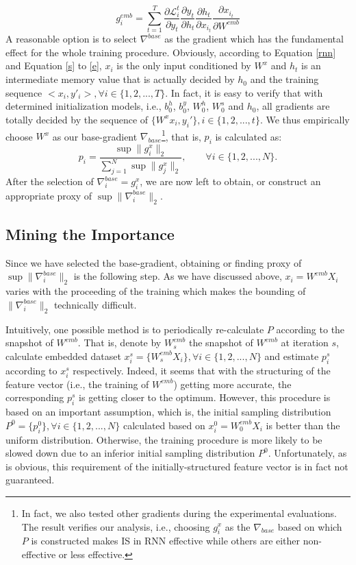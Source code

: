 \documentclass[twoside,leqno,twocolumn]{article}
\begin{document}
\begin{equation}
g_i^{emb}=\sum_{t=1}^{T}\frac{\partial \mathcal{L}_i^t}{\partial y_{t}}\frac{\partial y_t}{\partial h_{t}}\frac{\partial h_t}{\partial x_{i_t}}\frac{\partial x_{i_t}}{\partial W^{emb}}
\label{e}
\end{equation}
A reasonable option is to select $\nabla^{base}$ as the gradient which has the fundamental effect for the whole training procedure. Obviously, according to Equation \ref{rnn} and Equation \ref{s} to \ref{e}, $x_i$ is the only input conditioned by $W^x$ and $h_t$ is an intermediate memory value that is actually decided by $h_0$ and the training sequence $<x_i,y'_i>, \forall i \in \{1,2,...,T\}$. In fact, it is easy to verify that with determined initialization models, i.e., $b^h_0$, $b^y_0$, $W^h_0$, $W^s_0$ and $h_0$, all gradients are totally decided by the sequence of $\{W^xx_i,y_i'\}, i \in\{1,2,...,t\}$. We thus empirically choose $W^x$ as our base-gradient $\nabla_{base}$\footnote{In fact, we also tested other gradients during the experimental evaluations. The result verifies our analysis, i.e., choosing $g_i^x$ as the $\nabla_{base}$ based on which $P$ is constructed makes IS in RNN effective while others are either non-effective or less effective.}, that is, $p_i$ is calculated as:
\begin{equation}
	p_i=\frac{\sup\|g_i^x\|_2}{\sum_{j=1}^{N}\sup\|g_j^x\|_2}, \qquad \forall i \in \{1,2,...,N\}.
\end{equation}
After the selection of $\nabla^{base}_i=g_i^x$, we are now left to obtain, or construct an appropriate proxy of $\sup\|\nabla^{base}_i\|_2$.
\subsection{Mining the Importance}
Since we have selected the base-gradient, obtaining or finding proxy of $\sup \|\nabla^{base}_i\|_2$ is the following step. As we have discussed above, $x_i=W^{emb}X_{i}$ varies with the proceeding of the training which makes the bounding of $\|\nabla^{base}_i\|_2$ technically difficult.

Intuitively, one possible method is to periodically re-calculate $P$ according to the snapshot of $W^{emb}$. That is, denote by $W^{emb}_s$ the snapshot of $W^{emb}$ at iteration $s$, calculate embedded dataset $x_i^s=\{W^{emb}_{s}X_i\}, \forall i\in\{1,2,...,N\}$ and estimate $p_i^{s}$ according to $x_i^s$ respectively. Indeed, it seems that with the structuring of the feature vector (i.e., the training of $W^{emb}$) getting more accurate, the corresponding $p_i^s$ is getting closer to the optimum. However, this procedure is based on an important assumption, which is, the initial sampling distribution $P^0=\{p_i^0\}, \forall i \in \{1,2,...,N\}$ calculated based on $x_i^0=W^{emb}_0X_i$ is better than the uniform distribution. Otherwise, the training procedure is more likely to be slowed down due to an inferior initial sampling distribution $P^0$. Unfortunately, as is obvious, this requirement of the initially-structured feature vector is in fact not guaranteed.  
\end{document}
